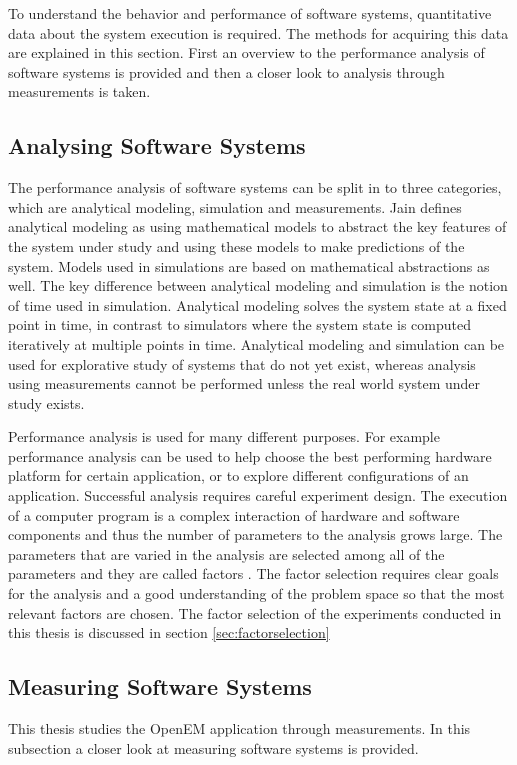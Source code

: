 To understand the behavior and performance of software systems, quantitative data about the system execution is required. The methods for acquiring this data are explained in this section. First an overview to the performance analysis of software systems is provided and then a closer look to analysis through measurements is taken.

\subsection{Analysing Software Systems}
\label{subsec:analysing-software}
The performance analysis of software systems can be split in to three categories, which are analytical modeling, simulation and measurements. Jain \cite{jain1991art} defines analytical modeling as using mathematical models to abstract the key features of the system under study and using these models to make predictions of the system. Models used in simulations are based on mathematical abstractions as well. The key difference between analytical modeling and simulation is the notion of time used in simulation. Analytical modeling solves the system state at a fixed point in time, in contrast to simulators where the system state is computed iteratively at multiple points in time. Analytical modeling and simulation can be used for explorative study of systems that do not yet exist, whereas analysis using measurements cannot be performed unless the real world system under study exists. \cite{jain1991art}


Performance analysis is used for many different purposes. For example performance analysis can be used to help choose the best performing hardware platform for certain application, or to explore different configurations of an application. Successful analysis requires careful experiment design. The execution of a computer program is a complex interaction of hardware and software components and thus the number of parameters to the analysis grows large. The parameters that are varied in the analysis are selected among all of the parameters and they are called factors \cite{jain1991art}. The factor selection requires clear goals for the analysis and a good understanding of the problem space so that the most relevant factors are chosen. The factor selection of the experiments conducted in this thesis is discussed in section \ref{sec:factorselection}


\subsection{Measuring Software Systems}
\label{subsec:measuring-software}
This thesis studies the OpenEM application through measurements. In this subsection a closer look at measuring software systems is provided.

